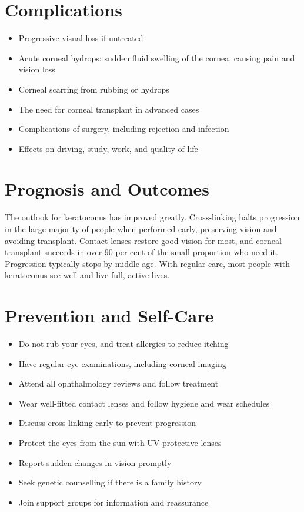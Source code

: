 \section*{Complications}
\begin{itemize}
    \item Progressive visual loss if untreated
    \item Acute corneal hydrops: sudden fluid swelling of the cornea, causing pain and vision loss
    \item Corneal scarring from rubbing or hydrops
    \item The need for corneal transplant in advanced cases
    \item Complications of surgery, including rejection and infection
    \item Effects on driving, study, work, and quality of life
\end{itemize}

\section*{Prognosis and Outcomes}
The outlook for keratoconus has improved greatly. Cross-linking halts progression in the large majority of people when performed early, preserving vision and avoiding transplant. Contact lenses restore good vision for most, and corneal transplant succeeds in over 90 per cent of the small proportion who need it. Progression typically stops by middle age. With regular care, most people with keratoconus see well and live full, active lives.

\section*{Prevention and Self-Care}
\begin{itemize}
    \item Do not rub your eyes, and treat allergies to reduce itching
    \item Have regular eye examinations, including corneal imaging
    \item Attend all ophthalmology reviews and follow treatment
    \item Wear well-fitted contact lenses and follow hygiene and wear schedules
    \item Discuss cross-linking early to prevent progression
    \item Protect the eyes from the sun with UV-protective lenses
    \item Report sudden changes in vision promptly
    \item Seek genetic counselling if there is a family history
    \item Join support groups for information and reassurance
\end{itemize}

